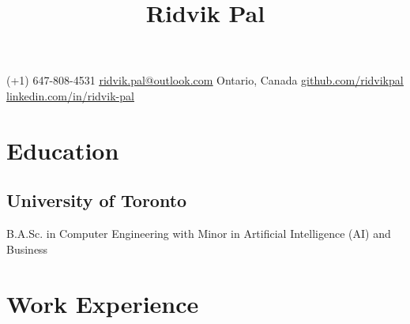 \documentclass[10pt, a4paper]{article}
\begin{document}
\title{\vspace{-1.5cm}\textbf{Ridvik Pal}\vspace{-1.5cm}}
\date{}
\author{}
\maketitle
\begin{center}
    (+1) 647-808-4531
    \hfill
    \href{mailto:ridvik.pal@outlook.com}{\underline{ridvik.pal@outlook.com}}
    \hfill
    Ontario, Canada
    \hfill
    \href{https://github.com/ridvikpal}{\underline{github.com/ridvikpal}}
    \hfill
    \href{https://www.linkedin.com/in/ridvik-pal}{\underline{linkedin.com/in/ridvik-pal}}
\end{center}\vspace{-10pt}

\section*{Education}
\subsection*{University of Toronto \hfill {}}
B.A.Sc. in Computer Engineering with Minor in Artificial Intelligence (AI) and Business


\section*{Work Experience}

\end{document}

